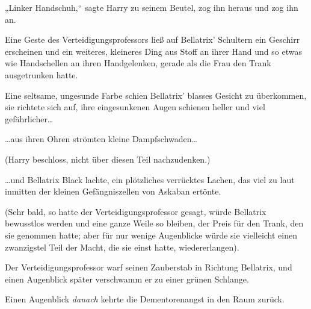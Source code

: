 „Linker Handschuh,“ sagte Harry zu seinem Beutel, zog ihn heraus und zog ihn an.

Eine Geste des Verteidigungsprofessors ließ auf Bellatrix' Schultern ein Geschirr erscheinen und ein weiteres, kleineres Ding aus Stoff an ihrer Hand und so etwas wie Handschellen an ihren Handgelenken, gerade als die Frau den Trank ausgetrunken hatte.

Eine seltsame, ungesunde Farbe schien Bellatrix' blasses Gesicht zu überkommen, sie richtete sich auf, ihre eingesunkenen Augen schienen heller und viel gefährlicher…

…aus ihren Ohren strömten kleine Dampfschwaden…

(Harry beschloss, nicht über diesen Teil nachzudenken.)

…und Bellatrix Black lachte, ein plötzliches verrücktes Lachen, das viel zu laut inmitten der kleinen Gefängniszellen von Askaban ertönte.

(Sehr bald, so hatte der Verteidigungsprofessor gesagt, würde Bellatrix bewusstlos werden und eine ganze Weile so bleiben, der Preis für den Trank, den sie genommen hatte; aber für nur wenige Augenblicke würde sie vielleicht einen zwanzigstel Teil der Macht, die sie einst hatte, wiedererlangen).

Der Verteidigungsprofessor warf seinen Zauberstab in Richtung Bellatrix, und einen Augenblick später verschwamm er zu einer grünen Schlange.

Einen Augenblick \emph{danach} kehrte die Dementorenangst in den Raum zurück.


